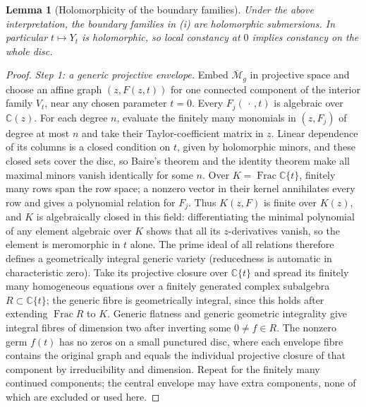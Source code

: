 \documentclass[12pt]{article}
\newcommand{\M}{\mathcal M}
\newcommand{\cl}[1]{\overline{#1}}
\newtheorem{lemma}[theorem]{Lemma}
\theoremstyle{remark}
\begin{document}
\begin{lemma}[Holomorphicity of the boundary families]\label{lem:regularity}
Under the above interpretation, the boundary families in (i)
are holomorphic submersions. In particular \(t\mapsto Y_t\)
is holomorphic, so local constancy at \(0\) implies constancy
on the whole disc.
\end{lemma}
\begin{proof}
\emph{Step 1: a generic projective envelope.}
Embed \(\cl{\M}_g\) in projective space and choose an affine graph
\((z,F(z,t))\) for one connected component of the interior
family \(V_t\), near any chosen parameter \(t=0\).
Every \(F_j(\,\cdot\,,t)\) is algebraic over \(\mathbb C(z)\).
For each degree \(n\), evaluate the finitely many monomials
in \((z,F_j)\) of degree at most \(n\) and take their
Taylor-coefficient matrix in \(z\).
Linear dependence of its columns is a closed condition on
\(t\), given by holomorphic minors, and these closed sets cover
the disc, so Baire's theorem and the identity theorem make all
maximal minors vanish identically for some \(n\).
Over \(K=\operatorname{Frac}\mathbb C\{t\}\), finitely many
rows span the row space; a nonzero vector in their kernel
annihilates every row and gives a polynomial relation for \(F_j\).
Thus \(K(z,F)\) is finite over \(K(z)\), and
\(K\) is algebraically closed in this field:
differentiating the minimal polynomial of any element
algebraic over \(K\) shows that all its \(z\)-derivatives
vanish, so the element is meromorphic in \(t\) alone.
The prime ideal of all relations therefore defines a
geometrically integral generic variety \cite[Tag 037P]{Stacks}
(reducedness is automatic in characteristic zero). Take its
projective closure over \(\mathbb C\{t\}\) and spread its finitely
many homogeneous equations over a finitely generated complex
subalgebra \(R\subset\mathbb C\{t\}\); the generic fibre
is geometrically integral, since this holds after extending
\(\operatorname{Frac}R\) to \(K\). Generic flatness and
generic geometric integrality
\cite[Tags 052A, 0559, 0578]{Stacks} give integral fibres
of dimension two after inverting some \(0\ne f\in R\).
The nonzero germ \(f(t)\) has no zeros on a small punctured disc,
where each envelope fibre contains the original graph and equals
the individual projective closure of that component by
irreducibility and dimension. Repeat for the finitely many continued components;
the central envelope may have extra components, none of which are
excluded or used here.


\end{proof}
\end{document}
